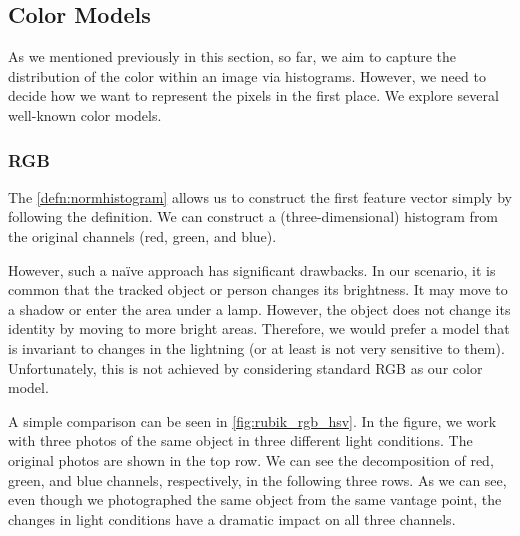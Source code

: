 \subsection{Color Models}

As we mentioned previously in this section, so far, we aim to capture the distribution of the color within an image via histograms. However, we need to decide how we want to represent the pixels in the first place. We explore several well-known color models.

\subsubsection{RGB}

The \autoref{defn:normhistogram} allows us to construct the first feature vector simply by following the definition. We can construct a (three-dimensional) histogram from the original channels (red, green, and blue).

However, such a naïve approach has significant drawbacks. In our scenario, it is common that the tracked object or person changes its brightness. It may move to a shadow or enter the area under a lamp. However, the object does not change its identity by moving to more bright areas. Therefore, we would prefer a model that is invariant to changes in the lightning (or at least is not very sensitive to them). Unfortunately, this is not achieved by considering standard RGB as our color model.


A simple comparison can be seen in \autoref{fig:rubik_rgb_hsv}. In the figure, we work with three photos of the same object in three different light conditions. The original photos are shown in the top row. We can see the decomposition of red, green, and blue channels, respectively, in the following three rows. As we can see, even though we photographed the same object from the same vantage point, the changes in light conditions have a dramatic impact on all three channels.

